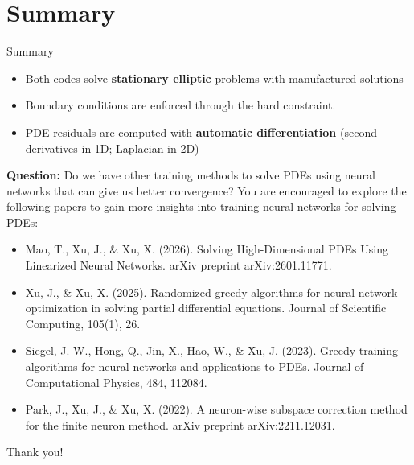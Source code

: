 \documentclass[10pt]{beamer}
\begin{document}
\section{Summary}
\begin{frame}{Summary}
	\begin{itemize}
		\item Both codes solve \textbf{stationary elliptic} problems with manufactured solutions
		\item Boundary conditions are enforced through the hard constraint. 
		\item PDE residuals are computed with \textbf{automatic differentiation} (second derivatives in 1D; Laplacian in 2D)
	\end{itemize}
	\vspace{0.4cm}
	\textbf{Question:} Do we have other training methods to solve PDEs using neural networks that can give us better convergence?
	\vfill 
	You are encouraged to explore the following papers to gain more insights into training neural networks for solving PDEs: 
	\begin{itemize}
		\scriptsize 
		\item Mao, T., Xu, J., \& Xu, X. (2026). Solving High-Dimensional PDEs Using Linearized Neural Networks. arXiv preprint arXiv:2601.11771.
		\item Xu, J., \& Xu, X. (2025). Randomized greedy algorithms for neural network optimization in solving partial differential equations. Journal of Scientific Computing, 105(1), 26.
		\item Siegel, J. W., Hong, Q., Jin, X., Hao, W., \& Xu, J. (2023). Greedy training algorithms for neural networks and applications to PDEs. Journal of Computational Physics, 484, 112084.
		\item Park, J., Xu, J., \& Xu, X. (2022). A neuron-wise subspace correction method for the finite neuron method. arXiv preprint arXiv:2211.12031.
	\end{itemize} 
\end{frame}

\begin{frame}
	\centering
	\Large Thank you!
\end{frame}
\end{document}
